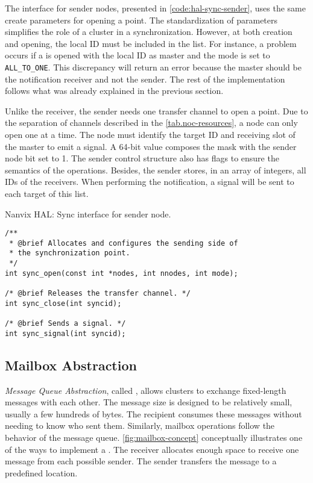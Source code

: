 				The \sync interface for sender nodes, presented in
				\autoref{code:hal-sync-sender}, uses the same create parameters for
				opening a \sync point. The standardization of parameters simplifies
				the role of a cluster in a synchronization. However, at both creation
				and opening, the local ID must be included in the list. For instance,
				a problem occurs if a \sync is opened with the local ID as master and
				the mode is set to \texttt{ALL\_TO\_ONE}. This discrepancy will return an error
				because the master should be the notification receiver and not the
				sender. The rest of the implementation follows what was already
				explained in the previous section.

				Unlike the receiver, the sender needs one \cnoc transfer channel to
				open a \sync point. Due to the separation of channels described in
				the \autoref{tab.noc-resources}, a node can only open one \sync at
				a time. The node must identify the target ID and receiving slot of
				the master to emit a signal. A 64-bit value composes the mask with
				the sender node bit set to 1. The sender control structure also has
				flags to ensure the semantics of the operations. Besides, the sender
				stores, in an array of integers, all IDs of the receivers. When
				performing the notification, a signal will be sent to each target
				of this list.

\begin{listing}[!bh]
\caption{Nanvix HAL: Sync interface for sender node.}
\label{code:hal-sync-sender}
\begin{verbatim}
/**
 * @brief Allocates and configures the sending side of
 * the synchronization point.
 */
int sync_open(const int *nodes, int nnodes, int mode);

/* @brief Releases the transfer channel. */
int sync_close(int syncid);

/* @brief Sends a signal. */
int sync_signal(int syncid);
\end{verbatim}
\end{listing}

		\subsection{Mailbox Abstraction}
		\label{sec.mailbox-abs}

			\textit{Message Queue Abstraction}, called \mailbox, allows clusters to exchange
			fixed-length messages with each other. The message size is designed to be
			relatively small, usually a few hundreds of bytes. The recipient consumes these
			messages without needing to know who sent them. Similarly, mailbox operations
			follow the behavior of the \posix message queue. \autoref{fig:mailbox-concept}
			conceptually illustrates one of the ways to implement a \mailbox. The receiver
			allocates enough space to receive one message from each possible sender.
			The sender transfers the message to a predefined location.

